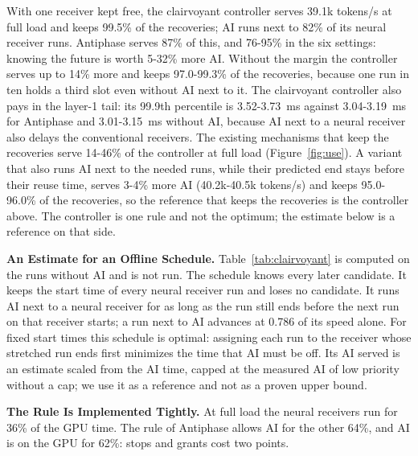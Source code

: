 \documentclass[acmsmall,screen,review,anonymous]{acmart}
\newcommand{\sys}{Antiphase\xspace}
\begin{document}
With one receiver kept free, the clairvoyant controller serves 39.1k tokens/s at full load and keeps 99.5\%
of the recoveries; AI runs next to 82\% of its neural receiver runs. \sys serves 87\% of this, and 76-95\%
in the six settings: knowing the future is worth 5-32\% more AI. Without the margin the controller serves
up to 14\% more and keeps 97.0-99.3\% of the recoveries, because one run in ten holds a third slot even
without AI next to it. The clairvoyant controller also pays in the layer-1 tail: its 99.9th percentile is
3.52-3.73~ms against 3.04-3.19~ms for \sys and 3.01-3.15~ms without AI, because AI next to a neural receiver
also delays the conventional receivers. The existing mechanisms that keep the recoveries serve 14-46\% of
the controller at full load (Figure~\ref{fig:use}). A variant that also runs AI next to the needed runs, while their predicted end stays before their reuse
time, serves 3-4\% more AI (40.2k-40.5k tokens/s) and keeps 95.0-96.0\% of the recoveries, so the
reference that keeps the recoveries is the controller above. The controller is one rule and not the
optimum; the estimate below is a reference on that side.

\noindent\textbf{An Estimate for an Offline Schedule.} Table~\ref{tab:clairvoyant} is computed on the runs
without AI and is not run. The schedule knows every later candidate. It keeps
the start time of every neural receiver run and loses no candidate. It runs AI next to a neural
receiver for as long as the run still ends before the next run on that receiver starts; a run next to AI
advances at 0.786 of its speed alone. For fixed start times this schedule is optimal: assigning each run to
the receiver whose stretched run ends first minimizes the time that AI must be off. Its AI served is an
estimate scaled from the AI time, capped at the measured AI of low priority without a cap; we use it as a
reference and not as a proven upper bound.

\noindent\textbf{The Rule Is Implemented Tightly.} At full load the neural receivers run for 36\% of the GPU
time. The rule of \sys allows AI for the other 64\%, and AI is on the GPU for 62\%: stops and grants cost
two points.
\end{document}
